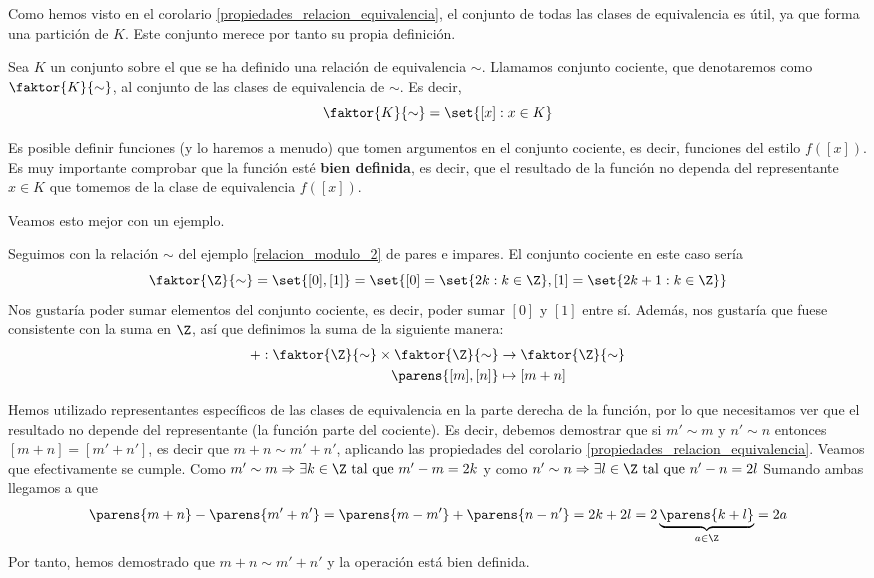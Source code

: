 \documentclass[../algebra_lineal.tex]{subfiles}
\begin{document}
Como hemos visto en el corolario \ref{propiedades_relacion_equivalencia}, el conjunto de todas las clases de equivalencia es útil, ya que forma una partición de $K$. Este conjunto merece por tanto su propia definición.
\begin{definition}
    Sea $K$ un conjunto sobre el que se ha definido una relación de equivalencia $\sim$. Llamamos conjunto cociente, que denotaremos como $\faktor{K}{\sim}$, al conjunto de las clases de equivalencia de $\sim$. Es decir,
    \[
        \faktor{K}{\sim} = \set{[x] : x \in K}
    \]
\end{definition}

\begin{remark}
    Es posible definir funciones (y lo haremos a menudo) que tomen argumentos en el conjunto cociente, es decir, funciones del estilo $f([x])$. Es muy importante comprobar que la función esté \textbf{bien definida}, es decir, que el resultado de la función no dependa del representante $x \in K$ que tomemos de la clase de equivalencia $f([x])$.  
\end{remark}

Veamos esto mejor con un ejemplo.

\begin{example}
    \label{ejemplo_buena_definicion}
    Seguimos con la relación $\sim$ del ejemplo \ref{relacion_modulo_2} de pares e impares. El conjunto cociente en este caso sería
    \[
        \faktor{\Z}{\sim} = \set{[0], [1]} = \set{ [0] = \set{2k : k \in \Z}, [1] = \set{2k+1 : k \in \Z} }
    \]
    Nos gustaría poder sumar elementos del conjunto cociente, es decir, poder sumar $[0]$ y $[1]$ entre sí. Además, nos gustaría que fuese consistente con la suma en $\Z$, así que definimos la suma de la siguiente manera:
    \begin{align*}
        + :  \faktor{\Z}{\sim} \times \faktor{\Z}{\sim} &\to \faktor{\Z}{\sim} \\
          \parens{[m], [n]} &\mapsto [m + n]
    \end{align*}

    Hemos utilizado representantes específicos de las clases de equivalencia en la parte derecha de la función, por lo que necesitamos ver que el resultado no depende del representante (la función parte del cociente). Es decir, debemos demostrar que si $m' \sim m$ y $n' \sim n$ entonces $[m+n]=[m'+n']$, es decir que $m+n \sim m' + n'$, aplicando las propiedades del corolario \ref{propiedades_relacion_equivalencia}. 
    Veamos que efectivamente se cumple. Como $m' \sim m \Rightarrow \exists k \in \Z \st m' - m = 2k$ y como $n' \sim n \Rightarrow \exists l \in \Z \st n' - n = 2l$ Sumando ambas llegamos a que 
    \[
        \parens{m+n} - \parens{m'+n'} = \parens{m-m'} + \parens{n-n'} = 2k + 2l = 2\underbrace{\parens{k+l}}_{a \in \Z} = 2a  
    \]
    Por tanto, hemos demostrado que $m+n \sim m'+n'$ y la operación está bien definida. 
\end{example}
\end{document}
